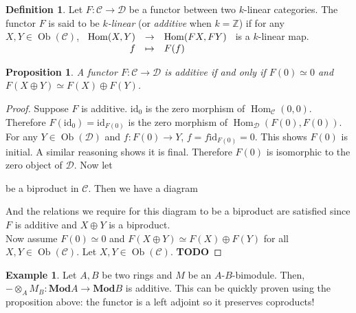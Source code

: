 \documentclass{article}
\newcommand{\id}{\mathrm{id}}
\newcommand{\Z}{\mathbb{Z}}
\newcommand{\cat}{\mathcal{C}}
\newcommand{\catt}{\mathcal{D}}
\newcommand{\Mod}{\mathbf{Mod}}
\DeclareMathOperator{\Ob}{Ob}
\DeclareMathOperator{\Hom}{Hom}
\newcommand{\todo}{\textbf{TODO}}
\newcommand{\applic}[4]{\begin{array}[t]{rcl}
#1 & \to & #2 \\
#3 & \mapsto & #4
\end{array}}
\theoremstyle{plain}
\newtheorem{proposition}[theorem]{Proposition}
\theoremstyle{definition}
\newtheorem{definition}[theorem]{Definition}
\newtheorem{example}[theorem]{Example}
\theoremstyle{remark}
\begin{document}
\begin{definition}
    Let $F : \cat \to \catt$ be a functor between two $k$-linear categories. The functor $F$ is said to be \emph{$k$-linear} (or \emph{additive} when $k = \Z$) if for any $X,Y \in \Ob(\cat)$, $\applic{\Hom(X,Y)}{\Hom(FX,FY)}{f}{F(f)}$ is a $k$-linear map.
\end{definition}

\begin{proposition}
    A functor $F : \cat \to \catt$ is additive if and only if $F(0) \simeq 0$ and $F(X \oplus Y) \simeq F(X) \oplus F(Y)$.
\end{proposition}

\begin{proof}
    Suppose $F$ is additive. $\id_0$ is the zero morphism of $\Hom_\cat (0,0)$. Therefore $F(\id_0) = \id_{F(0)}$ is the zero morphism of $\Hom_\catt (F(0),F(0))$. For any $Y \in \Ob(\catt)$ and $f : F(0) \to Y$, $f = f\id_{F(0)} = 0$. This shows $F(0)$ is initial. A similar reasoning shows it is final. Therefore $F(0)$ is isomorphic to the zero object of $\catt$. Now let  be a biproduct in $\cat$. Then we have a diagram
    \begin{center}
    \end{center}
    And the relations we require for this diagram to be a biproduct are satisfied since $F$ is additive and $X \oplus Y$ is a biproduct. \\
    Now assume $F(0) \simeq 0$ and $F(X \oplus Y) \simeq F(X) \oplus F(Y)$ for all $X,Y \in \Ob(\cat)$. Let $X,Y \in \Ob(\cat)$. \todo
\end{proof}

\begin{example}
    Let $A,B$ be two rings and $M$ be an $A$-$B$-bimodule. Then, $- \otimes_A M_B : \Mod A \to \Mod B$ is additive. This can be quickly proven using the proposition above: the functor is a left adjoint so it preserves coproducts!
\end{example}
\end{document}
